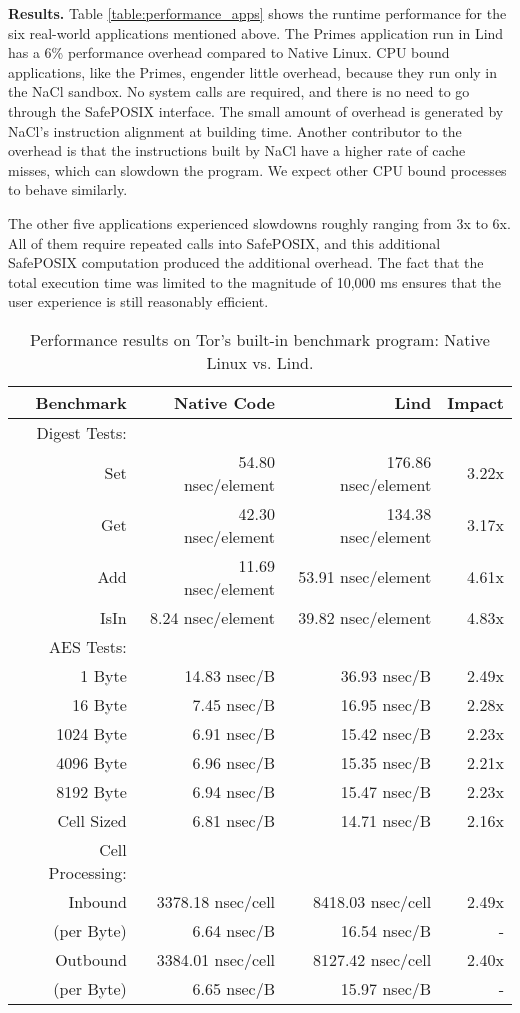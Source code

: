 {{{\noindent
\textbf{Results.}
Table \ref{table:performance_apps} shows the runtime performance
for the six real-world applications mentioned above.
The Primes application run in Lind has a 6\% performance overhead compared to
Native Linux. CPU bound applications, like the Primes, engender little overhead,
because they run only in the NaCl sandbox. No system calls are
required, and there is no need to go through the SafePOSIX interface. The small
 amount of overhead is generated by NaCl's instruction alignment at building time.
  Another contributor to the overhead is that the instructions built by NaCl
  have a higher rate of cache misses, which can slowdown the
program. We expect other CPU bound processes to behave similarly.

The other five applications experienced slowdowns roughly ranging from 3x to 6x.
All of them require repeated calls into SafePOSIX, and this additional SafePOSIX
computation produced the additional overhead.
The fact that the total execution time was limited
to the magnitude of 10,000 ms ensures that the
user experience is still reasonably efficient.

\begin{table}
\centering
\scriptsize
\begin{tabular}{|r|r|r|r|}
  \hline
  {\bf Benchmark} & {\bf Native Code} & {\bf Lind} & {\bf Impact}  \\
  \hline
  Digest Tests: & & & \\
  Set & 54.80 nsec/element & 176.86 nsec/element & 3.22x \\
  Get & 42.30 nsec/element & 134.38 nsec/element & 3.17x \\
  Add & 11.69 nsec/element & 53.91 nsec/element & 4.61x \\
  IsIn & 8.24 nsec/element & 39.82 nsec/element & 4.83x \\
  \hline
  AES Tests: & & & \\
  1 Byte & 14.83 nsec/B & 36.93 nsec/B & 2.49x \\
  16 Byte & 7.45 nsec/B & 16.95 nsec/B & 2.28x \\
  1024 Byte & 6.91 nsec/B & 15.42 nsec/B & 2.23x \\
  4096 Byte & 6.96 nsec/B & 15.35 nsec/B & 2.21x \\
  8192 Byte & 6.94 nsec/B & 15.47 nsec/B & 2.23x \\
  Cell Sized & 6.81 nsec/B & 14.71 nsec/B & 2.16x \\
  \hline
  Cell Processing: & & & \\
  Inbound & 3378.18 nsec/cell & 8418.03 nsec/cell & 2.49x \\
  (per Byte) & 6.64 nsec/B & 16.54 nsec/B & - \\
  Outbound & 3384.01 nsec/cell & 8127.42 nsec/cell & 2.40x \\
  (per Byte) & 6.65 nsec/B & 15.97 nsec/B & - \\
  \hline
\end{tabular}
\caption{\small Performance results on Tor's built-in benchmark program: Native
Linux vs. Lind.}
\label{table:performance_tor}
\end{table}

}}}
